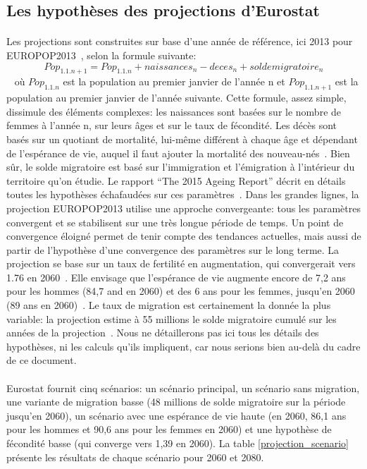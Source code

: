 \subsection{Les hypothèses des projections d’Eurostat}
\paragraph{}Les projections sont construites sur base d’une année de référence, ici 2013 pour EUROPOP2013~\citep{eurostat_europop13}, selon la formule suivante:
$$ Pop_{1.1.n+1} = Pop_{1.1.n} + naissances_{n} - deces_{n} + solde migratoire_{n} $$ ~\citep[pp.3]{INSEE}
où $Pop_{1.1.n}$ est la population au premier janvier de l'année n et $Pop_{1.1.n+1}$ est la population au premier janvier de l'année suivante. Cette formule, assez simple, dissimule des éléments complexes: les naissances sont basées sur le nombre de femmes à l’année n, sur leurs âges et sur le taux de fécondité. Les décès sont basés sur un quotiant de mortalité, lui-même différent à chaque âge et dépendant de l’espérance de vie, auquel il faut ajouter la mortalité des nouveau-nés~\citep[pp.4]{INSEE}. Bien sûr, le solde migratoire est basé sur l’immigration et l’émigration à l’intérieur du territoire qu’on étudie. Le rapport “The 2015 Ageing Report” décrit en détails toutes les hypothèses échafaudées sur ces paramètres~\citep[pp.8-14]{ageing_methodo}. Dans les grandes lignes, la projection EUROPOP2013 utilise une approche convergeante: tous les paramètres convergent et se stabilisent sur une très longue période de temps. Un point de convergence éloigné permet de tenir compte des tendances actuelles, mais aussi de partir de l’hypothèse d’une convergence des paramètres sur le long terme. La projection se base sur un taux de fertilité en augmentation, qui convergerait vers 1.76 en 2060~\citep[pp.9]{ageing_methodo}. Elle envisage que l’espérance de vie augmente encore de 7,2 ans pour les hommes (84,7 and en 2060) et des 6 ans pour les femmes, jusqu’en 2060 (89 ans en 2060)~\citep[pp.11]{ageing_methodo}. Le taux de migration est certainement la donnée la plus variable: la projection estime à 55 millions le solde migratoire cumulé sur les années de la projection~\citep[pp.14]{ageing_methodo}. Nous ne détaillerons pas ici tous les détails des hypothèses, ni les calculs qu’ils impliquent, car nous serions bien au-delà du cadre de ce document. 

\paragraph{}Eurostat fournit cinq scénarios: un scénario principal, un scénario sans migration, une variante de migration basse (48 millions de solde migratoire sur la période jusqu’en 2060),  un scénario avec une espérance de vie haute (en 2060, 86,1 ans pour les hommes et 90,6 ans pour les femmes en 2060) et une hypothèse de fécondité basse (qui converge vers 1,39 en 2060). La table \ref{projection_scenario} présente les résultats de chaque scénario pour 2060 et 2080.

